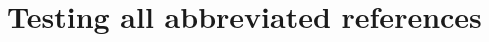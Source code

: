 \documentclass{article}
\begin{document}
\section*{Testing all abbreviated references}





\end{document}
